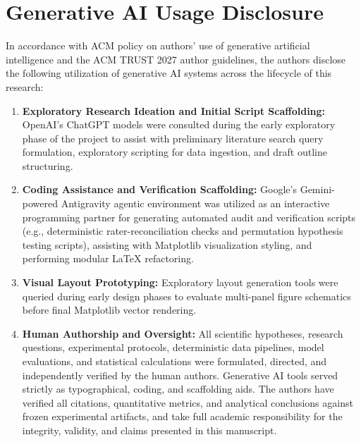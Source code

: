 \section*{Generative AI Usage Disclosure}
\label{sec:genai_disclosure}

In accordance with ACM policy on authors' use of generative artificial intelligence and the ACM TRUST 2027 author guidelines, the authors disclose the following utilization of generative AI systems across the lifecycle of this research:

\begin{enumerate}
    \item \textbf{Exploratory Research Ideation and Initial Script Scaffolding:} OpenAI's ChatGPT models were consulted during the early exploratory phase of the project to assist with preliminary literature search query formulation, exploratory scripting for data ingestion, and draft outline structuring.
    \item \textbf{Coding Assistance and Verification Scaffolding:} Google's Gemini-powered Antigravity agentic environment was utilized as an interactive programming partner for generating automated audit and verification scripts (e.g., deterministic rater-reconciliation checks and permutation hypothesis testing scripts), assisting with Matplotlib visualization styling, and performing modular \LaTeX{} refactoring.
    \item \textbf{Visual Layout Prototyping:} Exploratory layout generation tools were queried during early design phases to evaluate multi-panel figure schematics before final Matplotlib vector rendering.
    \item \textbf{Human Authorship and Oversight:} All scientific hypotheses, research questions, experimental protocols, deterministic data pipelines, model evaluations, and statistical calculations were formulated, directed, and independently verified by the human authors. Generative AI tools served strictly as typographical, coding, and scaffolding aids. The authors have verified all citations, quantitative metrics, and analytical conclusions against frozen experimental artifacts, and take full academic responsibility for the integrity, validity, and claims presented in this manuscript.
\end{enumerate}

